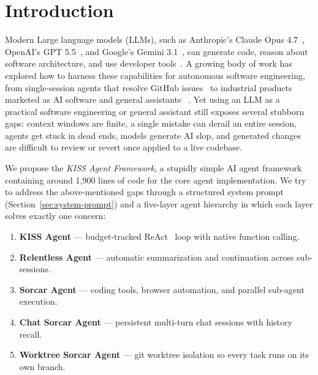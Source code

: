 \documentclass{article}
\begin{document}
\section{Introduction}
\label{sec:intro}

Modern Large language models (LLMs), such as Anthropic's Claude Opus 4.7~\citep{anthropic2026opus47}, OpenAI's GPT 5.5~\citep{openai2026gpt55}, and Google's Gemini 3.1~\citep{google2026gemini31}, can generate code, reason about software architecture, and use developer tools~\citep{chen2021evaluating,roziere2023code}.  A growing body of work has explored how to harness these capabilities for autonomous software engineering, from single-session agents that resolve GitHub issues~\citep{yang2024sweagent,wang2024openhands} to industrial products marketed as AI software and general assistants ~\citep{copilot2021,cursor2024,devin2024,claudecode2025,codex2025,openclaw2025}. Yet using an LLM as a practical software engineering or general assistant still exposes several stubborn gaps: context windows are finite, a single mistake can derail an entire session, agents get stuck in dead ends, models generate AI slop, and generated changes are difficult to review or revert once applied to a live codebase.

We propose the \emph{KISS Agent Framework}, a stupidly simple AI agent framework containing around 1,900 lines of code for the core agent implementation.  We try to address the above-mentioned gaps through a structured system prompt (Section~\ref{sec:system-prompt}) and a five-layer agent hierarchy in which each layer solves exactly one concern:

\begin{enumerate}[nosep]
  \item \textbf{KISS Agent} --- budget-tracked
ReAct~\citep{yao2023react} loop with native function calling.
  \item \textbf{Relentless Agent} --- automatic summarization and continuation 
across sub-sessions.
  \item \textbf{Sorcar Agent} --- coding tools, browser automation,
and parallel sub-agent execution.
  \item \textbf{Chat Sorcar Agent} --- persistent multi-turn chat
sessions with history recall.
  \item \textbf{Worktree Sorcar Agent} --- git worktree isolation so
every task runs on its own branch.
\end{enumerate}
\end{document}
